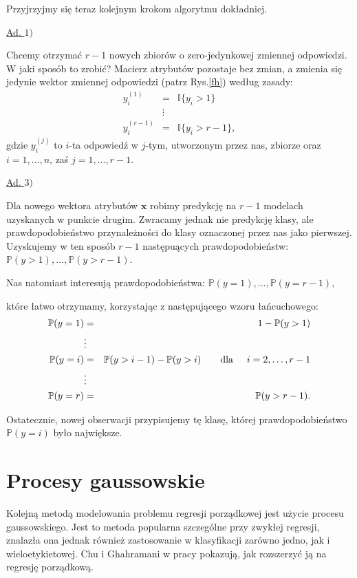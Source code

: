 \documentclass{mini}
\begin{document}
Przyjrzyjmy się teraz kolejnym krokom algorytmu dokładniej.

\underline{Ad. $1)$}

Chcemy otrzymać $r-1$ nowych zbiorów o zero-jedynkowej zmiennej odpowiedzi. W jaki sposób to zrobić?
Macierz atrybutów pozostaje bez zmian, a zmienia się jedynie wektor zmiennej odpowiedzi (patrz Rys.\ref{fh}) według zasady:
\begin{eqnarray*}
y_i^{(1)} &=& \mathbb{I}\lbrace y_i>1 \rbrace\\
&\vdots& \\
y_i^{(r-1)} &=& \mathbb{I}\lbrace y_i>r-1 \rbrace,
\end{eqnarray*}
gdzie $y_i^{(j)}$ to $i$-ta odpowiedź w $j$-tym, utworzonym przez nas, zbiorze oraz $i=1,\ldots,n$, zaś $j=1,\ldots, r-1$. 

\underline{Ad. $3)$}

Dla nowego wektora atrybutów $\textbf{x}$ robimy predykcję na $r-1$ modelach uzyskanych w punkcie drugim. Zwracamy jednak nie predykcję klasy, ale prawdopodobieństwo przynależności do klasy oznaczonej przez nas jako pierwszej. Uzyskujemy w ten sposób $r-1$ następuących prawdopodobieństw: $\mathbb{P}(y > 1), \ldots, \mathbb{P}(y > r-1)$.

Nas natomiast interesują prawdopodobieństwa: $\mathbb{P}(y = 1), \ldots, \mathbb{P}(y = r-1)$,

które łatwo otrzymamy, korzystając z następującego wzoru łańcuchowego:
\begin{eqnarray*}
\mathbb{P}(y = 1) &=& 1 - \mathbb{P}(y > 1)\\
&\vdots& \\
\mathbb{P}(y = i) &=& \mathbb{P}(y > i-1) - \mathbb{P}(y > i) \qquad \text{dla}\hspace{5mm} i=2, \ldots, r-1\\
&\vdots& \\
\mathbb{P}(y = r) &=& \mathbb{P}(y > r-1).\\
\end{eqnarray*}

Ostatecznie, nowej obserwacji przypisujemy tę klasę, której prawdopodobieństwo $\mathbb{P}(y=i)$ było największe.

\section{Procesy gaussowskie}

Kolejną metodą modelowania problemu regresji porządkowej jest użycie procesu gaussowskiego. Jest to metoda popularna szczególne przy zwykłej regresji, znalazła ona jednak również zastosowanie w klasyfikacji zarówno jedno, jak i wieloetykietowej. Chu i Ghahramani w pracy \cite{reg} pokazują, jak rozszerzyć ją na regresję porządkową. 
\end{document}
